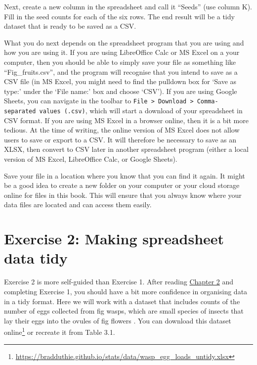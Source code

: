 \documentclass[
  openany]{scrbook}
\begin{document}
Next, create a new column in the spreadsheet and call it ``Seeds'' (use column K).
Fill in the seed counts for each of the six rows.
The end result will be a tidy dataset that is ready to be saved as a CSV.

What you do next depends on the spreadsheet program that you are using and how you are using it.
If you are using LibreOffice Calc or MS Excel on a your computer, then you should be able to simply save your file as something like ``Fig\_fruits.csv'', and the program will recognise that you intend to save as a CSV file (in MS Excel, you might need to find the pulldown box for `Save as type:' under the `File name:' box and choose `CSV').
If you are using Google Sheets, you can navigate in the toolbar to \texttt{File\ \textgreater{}\ Download\ \textgreater{}\ Comma-separated\ values\ (.csv)}, which will start a download of your spreadsheet in CSV format.
If you are using MS Excel in a browser online, then it is a bit more tedious.
At the time of writing, the online version of MS Excel does not allow users to save or export to a CSV.
It will therefore be necessary to save as an XLSX, then convert to CSV later in another spreadsheet program (either a local version of MS Excel, LibreOffice Calc, or Google Sheets).

Save your file in a location where you know that you can find it again.
It might be a good idea to create a new folder on your computer or your cloud storage online for files in this book.
This will ensure that you always know where your data files are located and can access them easily.

\hypertarget{exercise-2-making-spreadsheet-data-tidy}{%
\section{Exercise 2: Making spreadsheet data tidy}\label{exercise-2-making-spreadsheet-data-tidy}}

Exercise 2 is more self-guided than Exercise 1.
After reading \protect\hyperlink{Chapter_2}{Chapter 2} and completing Exercise 1, you should have a bit more confidence in organising data in a tidy format.
Here we will work with a dataset that includes counts of the number of eggs collected from fig wasps, which are small species of insects that lay their eggs into the ovules of fig flowers \citep{Weiblen2002}.
You can download this dataset online\footnote{\url{https://bradduthie.github.io/stats/data/wasp_egg_loads_untidy.xlsx}} or recreate it from Table 3.1.
\end{document}
